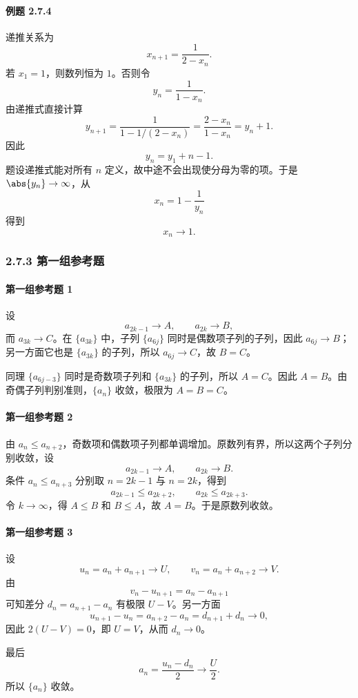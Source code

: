 \paragraph{例题 2.7.4}
\begin{xsolution}
递推关系为
\[
  x_{n+1}=\frac1{2-x_n}.
\]
若 $x_1=1$，则数列恒为 $1$。否则令
\[
  y_n=\frac1{1-x_n}.
\]
由递推式直接计算
\[
  y_{n+1}
  =\frac1{1-1/(2-x_n)}
  =\frac{2-x_n}{1-x_n}=y_n+1.
\]
因此
\[
  y_n=y_1+n-1.
\]
题设递推式能对所有 $n$ 定义，故中途不会出现使分母为零的项。于是 $\abs{y_n}\to\infty$，从
\[
  x_n=1-\frac1{y_n}
\]
得到
\[
  \boxed{x_n\to1}.
\]
\end{xsolution}

\subsubsection*{2.7.3 第一组参考题}

\paragraph{第一组参考题 1}
\begin{xsolution}
设
\[
  a_{2k-1}\to A,\qquad a_{2k}\to B,
\]
而 $a_{3k}\to C$。在 $\{a_{3k}\}$ 中，子列 $\{a_{6j}\}$ 同时是偶数项子列的子列，因此 $a_{6j}\to B$；另一方面它也是 $\{a_{3k}\}$ 的子列，所以 $a_{6j}\to C$，故 $B=C$。

同理 $\{a_{6j-3}\}$ 同时是奇数项子列和 $\{a_{3k}\}$ 的子列，所以 $A=C$。因此 $A=B$。由奇偶子列判别准则，$\{a_n\}$ 收敛，极限为 $A=B=C$。
\end{xsolution}

\paragraph{第一组参考题 2}
\begin{xsolution}
由 $a_n\le a_{n+2}$，奇数项和偶数项子列都单调增加。原数列有界，所以这两个子列分别收敛，设
\[
  a_{2k-1}\to A,\qquad a_{2k}\to B.
\]
条件 $a_n\le a_{n+3}$ 分别取 $n=2k-1$ 与 $n=2k$，得到
\[
  a_{2k-1}\le a_{2k+2},
  \qquad
  a_{2k}\le a_{2k+3}.
\]
令 $k\to\infty$，得 $A\le B$ 和 $B\le A$，故 $A=B$。于是原数列收敛。
\end{xsolution}

\paragraph{第一组参考题 3}
\begin{xsolution}
设
\[
  u_n=a_n+a_{n+1}\to U,
  \qquad
  v_n=a_n+a_{n+2}\to V.
\]
由
\[
  v_n-u_{n+1}=a_n-a_{n+1}
\]
可知差分 $d_n=a_{n+1}-a_n$ 有极限 $U-V$。另一方面
\[
  u_{n+1}-u_n=a_{n+2}-a_n=d_{n+1}+d_n\to0,
\]
因此 $2(U-V)=0$，即 $U=V$，从而 $d_n\to0$。

最后
\[
  a_n=\frac{u_n-d_n}{2}\to\frac U2.
\]
所以 $\{a_n\}$ 收敛。
\end{xsolution}

